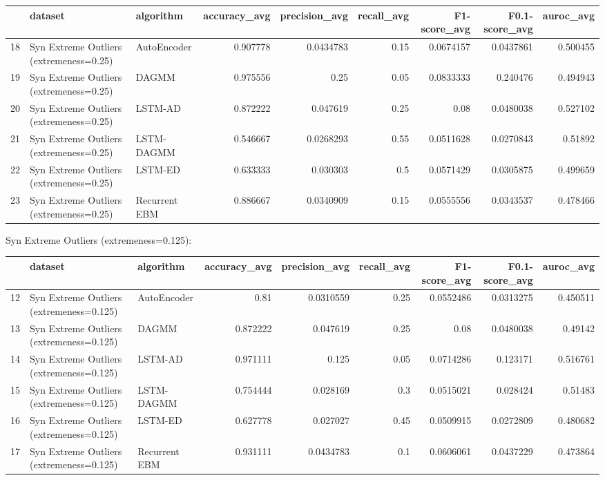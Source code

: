 \begin{tabular}{rllrrrrrr}
\hline
    & dataset                                 & algorithm     &   accuracy\_avg &   precision\_avg &   recall\_avg &   F1-score\_avg &   F0.1-score\_avg &   auroc\_avg \\
\hline
 18 & Syn Extreme Outliers (extremeness=0.25) & AutoEncoder   &       0.907778 &       0.0434783 &         0.15 &      0.0674157 &        0.0437861 &    0.500455 \\
 19 & Syn Extreme Outliers (extremeness=0.25) & DAGMM         &       0.975556 &       0.25      &         0.05 &      0.0833333 &        0.240476  &    0.494943 \\
 20 & Syn Extreme Outliers (extremeness=0.25) & LSTM-AD       &       0.872222 &       0.047619  &         0.25 &      0.08      &        0.0480038 &    0.527102 \\
 21 & Syn Extreme Outliers (extremeness=0.25) & LSTM-DAGMM    &       0.546667 &       0.0268293 &         0.55 &      0.0511628 &        0.0270843 &    0.51892  \\
 22 & Syn Extreme Outliers (extremeness=0.25) & LSTM-ED       &       0.633333 &       0.030303  &         0.5  &      0.0571429 &        0.0305875 &    0.499659 \\
 23 & Syn Extreme Outliers (extremeness=0.25) & Recurrent EBM &       0.886667 &       0.0340909 &         0.15 &      0.0555556 &        0.0343537 &    0.478466 \\
\hline
\end{tabular}

Syn Extreme Outliers (extremeness=0.125):

\begin{tabular}{rllrrrrrr}
\hline
    & dataset                                  & algorithm     &   accuracy\_avg &   precision\_avg &   recall\_avg &   F1-score\_avg &   F0.1-score\_avg &   auroc\_avg \\
\hline
 12 & Syn Extreme Outliers (extremeness=0.125) & AutoEncoder   &       0.81     &       0.0310559 &         0.25 &      0.0552486 &        0.0313275 &    0.450511 \\
 13 & Syn Extreme Outliers (extremeness=0.125) & DAGMM         &       0.872222 &       0.047619  &         0.25 &      0.08      &        0.0480038 &    0.49142  \\
 14 & Syn Extreme Outliers (extremeness=0.125) & LSTM-AD       &       0.971111 &       0.125     &         0.05 &      0.0714286 &        0.123171  &    0.516761 \\
 15 & Syn Extreme Outliers (extremeness=0.125) & LSTM-DAGMM    &       0.754444 &       0.028169  &         0.3  &      0.0515021 &        0.028424  &    0.51483  \\
 16 & Syn Extreme Outliers (extremeness=0.125) & LSTM-ED       &       0.627778 &       0.027027  &         0.45 &      0.0509915 &        0.0272809 &    0.480682 \\
 17 & Syn Extreme Outliers (extremeness=0.125) & Recurrent EBM &       0.931111 &       0.0434783 &         0.1  &      0.0606061 &        0.0437229 &    0.473864 \\
\hline
\end{tabular}

